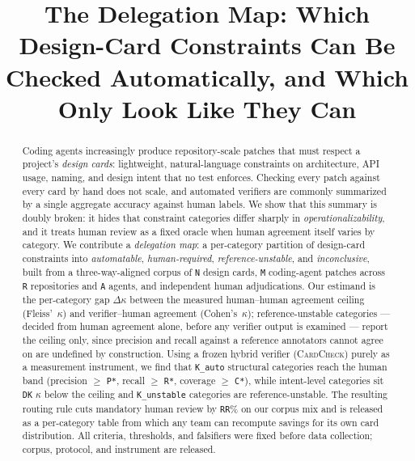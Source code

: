\documentclass[conference]{IEEEtran}
\newcommand{\ph}[1]{\colorbox{yellow!35}{\texttt{\footnotesize #1}}}
\newcommand{\cardcheck}{\textsc{CardCheck}}
\newcommand{\dk}{\Delta\kappa}
\begin{document}
\title{The Delegation Map: Which Design-Card Constraints Can Be Checked
Automatically, and Which Only Look Like They Can}

\author{
}

\maketitle

\begin{abstract}
Coding agents increasingly produce repository-scale patches that must respect a
project's \emph{design cards}: lightweight, natural-language constraints on
architecture, API usage, naming, and design intent that no test enforces.
Checking every patch against every card by hand does not scale, and automated
verifiers are commonly summarized by a single aggregate accuracy against human
labels. We show that this summary is doubly broken: it hides that constraint
categories differ sharply in \emph{operationalizability}, and it treats human
review as a fixed oracle when human agreement itself varies by category. We
contribute a \emph{delegation map}: a per-category partition of design-card
constraints into \emph{automatable}, \emph{human-required},
\emph{reference-unstable}, and \emph{inconclusive}, built from a three-way-aligned
corpus of \ph{N} design cards, \ph{M} coding-agent patches across
\ph{R} repositories and \ph{A} agents, and independent human adjudications. Our
estimand is the per-category gap $\dk$ between the measured human--human
agreement ceiling (Fleiss'~$\kappa$) and verifier--human agreement
(Cohen's~$\kappa$); reference-unstable categories --- decided from human
agreement alone, before any verifier output is examined --- report the ceiling
only, since precision and recall against a reference annotators cannot agree on
are undefined by construction. Using a frozen hybrid verifier (\cardcheck) purely
as a measurement instrument, we find that \ph{K\_auto} structural categories
reach the human band (precision $\geq$ \ph{P*}, recall $\geq$ \ph{R*}, coverage
$\geq$ \ph{C*}), while intent-level categories sit \ph{DK} $\kappa$ below the
ceiling and \ph{K\_unstable} categories are reference-unstable. The resulting
routing rule cuts mandatory human review by \ph{RR}\% on our corpus mix and is
released as a per-category table from which any team can recompute savings for
its own card distribution. All criteria, thresholds, and falsifiers were fixed
before data collection; corpus, protocol, and instrument are released.
\end{abstract}
\end{document}
